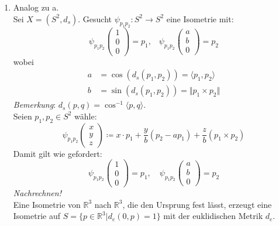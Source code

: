 \begin{solution}
\begin{enumerate}[label=(\alph*)]
    
    \item Analog zu a. \\
    Sei \( X = (S^2, d_s) \). Gesucht \( \psi_{p_1p_2}: S^2 \to S^2 \) eine Isometrie mit:
    \begin{equation*}
      \psi_{p_1p_2} \left(\begin{smallmatrix}
        1 \\ 0 \\ 0
      \end{smallmatrix} \right) = p_1\text{,} \quad
      \psi_{p_1p_2} \left(\begin{smallmatrix}
        a \\ b \\ 0
      \end{smallmatrix} \right) = p_2
    \end{equation*} 
    wobei 
    \begin{align*}
      a &= \cos(d_s(p_1,p_2)) = \langle p_1, p_2 \rangle \\
      b &= \sin (d_s(p_1,p_2)) = \Vert p_1 \times p_2 \Vert
    \end{align*}
    \emph{Bemerkung}: \( d_s(p,q) = \cos^{-1} \langle p,q \rangle \). \\
    Seien \( p_1, p_2 \in S^2 \) wähle:
    \begin{equation*}
      \psi_{p_1 p_2}\left(\begin{smallmatrix}
        x \\ y \\ z
      \end{smallmatrix} \right) \coloneqq x \cdot p_1 + \frac{y}{b} (p_2-ap_1) + \frac{z}{b}(p_1 \times p_2)
    \end{equation*}
    Damit gilt wie gefordert: 
    \begin{equation*}
      \psi_{p_1p_2}\left(\begin{smallmatrix}
        1\\ 0 \\ 0
      \end{smallmatrix} \right) = p_1, \quad
      \psi_{p_1p_2}\left(\begin{smallmatrix}
        a \\ b \\ 0
      \end{smallmatrix} \right) = p_2
    \end{equation*}
    \emph{Nachrechnen!} \\
    Eine Isometrie von \( \mathbb{R}^3 \) nach \( \mathbb{R}^3 \), die den Ursprung fest lässt, erzeugt eine Isometrie auf \( S = \{ p \in \mathbb{R}^3 | d_e(0,p) = 1 \} \) mit der euklidischen Metrik \( d_e \). \\

\end{enumerate}
\end{solution}
